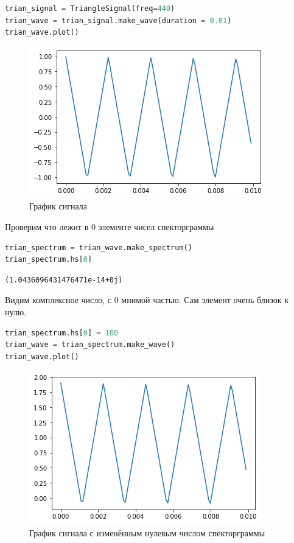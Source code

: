 \begin{lstlisting}[language=Python]
trian_signal = TriangleSignal(freq=440)
trian_wave = trian_signal.make_wave(duration = 0.01)
trian_wave.plot()
\end{lstlisting}

\begin{figure}[H]
	\begin{center}
		\includegraphics[scale=1]{fig/lab02/lab02_24_0.png}
		\caption{График сигнала}
	\end{center}
\end{figure}

Проверим что лежит в 0 элементе чисел спекторграммы

\begin{lstlisting}[language=Python]
trian_spectrum = trian_wave.make_spectrum()
trian_spectrum.hs[0]
\end{lstlisting}

\begin{lstlisting}
(1.0436096431476471e-14+0j)
\end{lstlisting}
Видим комплексное число, с 0 мнимой частью. Сам элемент очень близок к нулю.

\begin{lstlisting}[language=Python]
trian_spectrum.hs[0] = 100
trian_wave = trian_spectrum.make_wave()
trian_wave.plot()
\end{lstlisting}

\begin{figure}[H]
	\begin{center}
		\includegraphics[scale=1]{fig/lab02/lab02_28_0.png}
		\caption{График сигнала с изменённым нулевым числом спекторграммы}
	\end{center}
\end{figure}

